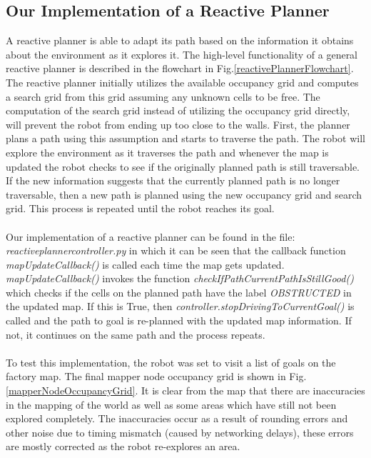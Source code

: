 \documentclass[a4paper,12pt]{article}
\begin{document}
		\subsection{Our Implementation of a Reactive Planner}

			A reactive planner is able to adapt its path based on the information it obtains about the environment as it explores it. The high-level functionality of a general reactive planner is described in the flowchart in Fig.\ref{reactivePlannerFlowchart}. The reactive planner initially utilizes the available occupancy grid and computes a search grid from this grid assuming any unknown cells to be free. The computation of the search grid instead of utilizing the occupancy grid directly, will prevent the robot from ending up too close to the walls. First, the planner plans a path using this assumption and starts to traverse the path. The robot will explore the environment as it traverses the path and whenever the map is updated the robot checks to see if the originally planned path is still traversable. If the new information suggests that the currently planned path is no longer traversable, then a new path is planned using the new occupancy grid and search grid. This process is repeated until the robot reaches its goal.
			\\
			\\
			Our implementation of a reactive planner can be found in the file: \textit{reactive\textunderscore planner\textunderscore controller.py} in which it can be seen that the callback function\textit{ mapUpdateCallback()} is called each time the map gets updated. \textit{mapUpdateCallback()} invokes the function \textit{checkIfPathCurrentPathIsStillGood()} which checks if the cells on the planned path have the label \textit{OBSTRUCTED} in the updated map. If this is True, then \textit{controller.stopDrivingToCurrentGoal()} is called and the path to goal is re-planned with the updated map information. If not, it continues on the same path and the process repeats.
			\\
			\\
			To test this implementation, the robot was set to visit a list of goals on the factory map. The final mapper node occupancy grid is shown in Fig.\ref{mapperNodeOccupancyGrid}. It is clear from the map that there are inaccuracies in the mapping of the world as well as some areas which have still not been explored completely. The inaccuracies occur as a result of rounding errors and other noise due to timing mismatch (caused by networking delays), these errors are mostly corrected as the robot re-explores an area. 
\end{document}
